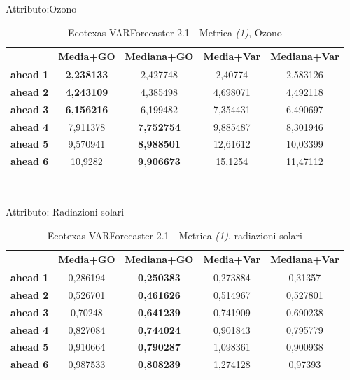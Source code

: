 \documentclass[12pt,a4paper,oneside,openright]{book}
\begin{document}
\medskip

Attributo:Ozono \\ 

\begin{table}[H]
\centering
\begin{tabular}{|c|c|c|c|c|}
\hline
 & \textbf{Media+GO} & \textbf{Mediana+GO} & \textbf{Media+Var} & \textbf{Mediana+Var} \\
\hline
\textbf{ahead 1} & \textbf{2,238133} & 2,427748 & 2,40774 & 2,583126 \\
\hline
\textbf{ahead 2} & \textbf{4,243109} & 4,385498 & 4,698071 & 4,492118 \\
\hline
\textbf{ahead 3} & \textbf{6,156216} & 6,199482 & 7,354431 & 6,490697 \\
\hline
\textbf{ahead 4} & 7,911378 & \textbf{7,752754} & 9,885487 & 8,301946 \\
\hline
\textbf{ahead 5} & 9,570941 & \textbf{8,988501} & 12,61612 & 10,03399 \\
\hline
\textbf{ahead 6} & 10,9282 & \textbf{9,906673} & 15,1254 & 11,47112 \\
\hline
\end{tabular} \\
\caption{Ecotexas VARForecaster 2.1 - Metrica \textit{(1)}, Ozono}
\end{table}

\medskip

Attributo: Radiazioni solari \\ 

\begin{table}[H]
\centering
\begin{tabular}{|c|c|c|c|c|}
\hline
 & \textbf{Media+GO} & \textbf{Mediana+GO} & \textbf{Media+Var} & \textbf{Mediana+Var} \\
\hline
\textbf{ahead 1} & 0,286194 & \textbf{0,250383} & 0,273884 & 0,31357 \\
\hline
\textbf{ahead 2} & 0,526701 & \textbf{0,461626} & 0,514967 & 0,527801 \\
\hline
\textbf{ahead 3} & 0,70248 & \textbf{0,641239} & 0,741909 & 0,690238 \\
\hline
\textbf{ahead 4} & 0,827084 & \textbf{0,744024} & 0,901843 & 0,795779 \\
\hline
\textbf{ahead 5} & 0,910664 & \textbf{0,790287} & 1,098361 & 0,900938 \\
\hline
\textbf{ahead 6} & 0,987533 & \textbf{0,808239} & 1,274128 & 0,97393 \\
\hline
\end{tabular}
\caption{Ecotexas VARForecaster 2.1 - Metrica \textit{(1)}, radiazioni solari}
\end{table}
\newpage
\end{document}
